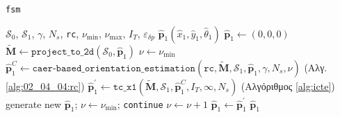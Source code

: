\begin{algorithm}
  \caption{\texttt{fsm}}
  \label{alg:algorithm_fsm}
  \begin{spacing}{1.2}
  \begin{algorithmic}[1]
    \REQUIRE $\mathcal{S}_0$, $\mathcal{S}_1$, $\gamma$, $N_s$, \texttt{rc}, $\nu_{\min}$, $\nu_{\max}$, $I_T$, $\varepsilon_{\delta p}$
    \ENSURE $\hat{\bm{p}}_1(\hat{x}_1, \hat{y}_1, \hat{\theta}_1)$
    \STATE $\hat{\bm{p}}_1 \leftarrow (0,0,0)$ \label{fsm:initp}
    \STATE $\widetilde{\bm{M}} \leftarrow \texttt{project\_to\_2d}(\mathcal{S}_0, \hat{\bm{p}}_1)$ \label{fsm:a}
    \STATE $\nu \leftarrow \nu_{\min}$
    \WHILE {$\nu \leq \nu_{\max}$}
      \STATE $\hat{\bm{p}}_1^C\leftarrow \texttt{caer-based\_orientation\_estimation}(\texttt{rc}, \widetilde{\bm{M}}, \mathcal{S}_1, \hat{\bm{p}}_1, \gamma, N_s, \nu)$ \hfill (Αλγ. \ref{alg:02_04_04:rc})
      \STATE $\hat{\bm{p}}_1^{\prime} \leftarrow \texttt{tc\_x1}(\widetilde{\bm{M}}, \mathcal{S}_1, \hat{\bm{p}}_1^C, I_T, \infty, N_s)$  \hfill (Αλγόριθμος \ref{alg:icte})
        \STATE generate new $\hat{\bm{p}}_1$; $\nu \leftarrow \nu_{\min}$; \texttt{continue}
      \ENDIF
        \STATE $\nu \leftarrow \nu + 1$
      \ENDIF
      \STATE $\hat{\bm{p}}_1 \leftarrow \hat{\bm{p}}_1^{\prime}$
    \ENDWHILE
    \RETURN $\hat{\bm{p}}_1$
  \end{algorithmic}
  \end{spacing}
\end{algorithm}
